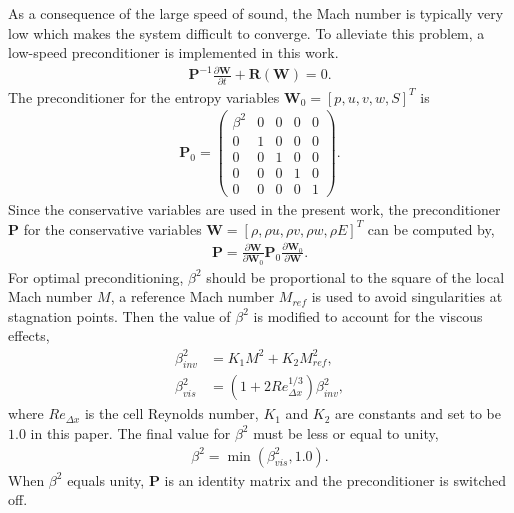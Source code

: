 As a consequence of the large speed of sound, the Mach number is typically very low which makes the system difficult to converge. To alleviate this problem, a low-speed preconditioner \cite{turkel1987preconditioned} is implemented in this work.
\begin{align}
\mathbf{P}^{-1} \frac{\partial \mathbf{W}}{\partial t}+\mathbf{R}(\mathbf{W})=0.
\end{align}
The preconditioner for the entropy variables $\mathbf{W}_{0}=[p,u,v,w,S]^{T}$ is
\begin{align} 
\mathbf{P}_{0}=\begin{pmatrix}
\beta^{2}&  0&  0&  0& 0\\ 
 0& 1&  0& 0& 0\\ 
 0&  0&  1&  0& 0\\ 
 0&  0&  0&  1& 0\\ 
 0&  0&  0&  0& 1
\end{pmatrix}.
\end{align}
Since the conservative variables are used in the present work, the preconditioner $\mathbf{P}$ for the conservative variables $\mathbf{W}=[\rho, \rho u, \rho v, \rho w, \rho E]^{T}$ can be computed by,
\begin{align}
\mathbf{P}=\frac{\partial \mathbf{W}}{\partial \mathbf{W}_{0}} \mathbf{P}_{0} \frac{\partial \mathbf{W}_{0}}{\partial \mathbf{W}}.
\end{align}
For optimal preconditioning, $\beta^{2}$ should be proportional to the square of the local Mach number $M$, a reference Mach number $M_{ref}$ is used to avoid singularities at stagnation points. Then the value of $\beta^{2}$ is modified to account for the viscous effects,
\begin{align} 
\beta^{2}_{inv} &= K_{1}M^{2}+K_{2}M^{2}_{ref},  \\
\beta^{2}_{vis} &= (1+2Re^{1/3}_{\Delta x})\beta^{2}_{inv}, 
\end{align}
where $Re_{\Delta x}$ is the cell Reynolds number, $K_{1}$ and $K_{2}$ are constants and set to be $1.0$ in this paper. The final value for $\beta^{2}$ must be less or equal to unity,
\begin{align} 
\beta^{2}=\min(\beta^{2}_{vis},1.0).
\end{align}
When $\beta^{2}$ equals unity, $\mathbf{P}$ is an identity matrix and the preconditioner is switched off.

